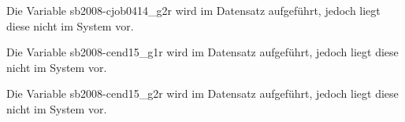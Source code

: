 \documentclass[a4paper]{article}
\begin{document}
				

				

				

				

				

				

				

				

				

				

				

				

				

		Die Variable sb2008-cjob0414\_g2r wird im Datensatz aufgeführt, jedoch liegt diese nicht im System vor.

				

				

				

				

				

				

				

		Die Variable sb2008-cend15\_g1r wird im Datensatz aufgeführt, jedoch liegt diese nicht im System vor.

		Die Variable sb2008-cend15\_g2r wird im Datensatz aufgeführt, jedoch liegt diese nicht im System vor.

				

				

				

				

				

				

				

				

				

				

				

				

				

				

				

				

\printbibliography 
\end{document}

